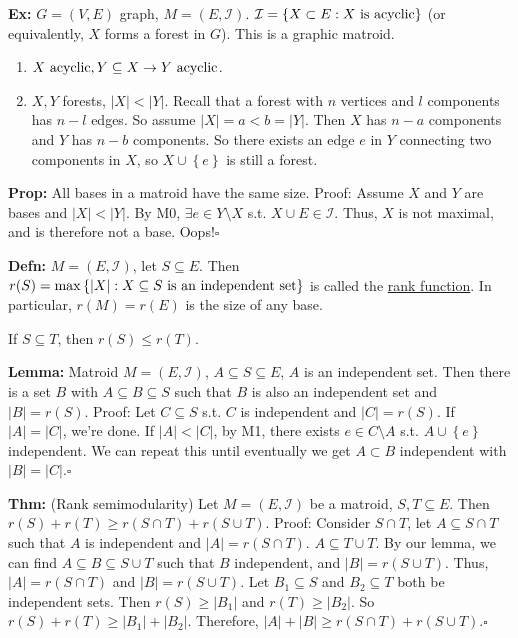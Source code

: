 \documentclass[10pt,letterpaper]{article}
\newcommand{\n}{\hfill\break}
\newcommand{\up}{\vspace{-\baselineskip}}
\newcommand{\lemma}[1]{\par\noindent\settowidth{\hangindent}{\textbf{Lemma: }}\textbf{Lemma: }#1}
\newcommand{\defn}[1]{\par\noindent\settowidth{\hangindent}{\textbf{Defn: }}\textbf{Defn: }#1\n}
\newcommand{\thm}[1]{\par\noindent\settowidth{\hangindent}{\textbf{Thm: }}\textbf{Thm: }#1\n}
\newcommand{\prop}[1]{\par\noindent\settowidth{\hangindent}{\textbf{Prop: }}\textbf{Prop: }#1\n}
\newcommand{\ex}[1]{\par\noindent\settowidth{\hangindent}{\textbf{Ex: }}\textbf{Ex: }#1\n}
\newcommand{\proven}{\;$\square$\n}
\newcommand{\ptxt}[1]{\textrm{\textnormal{#1}}}
\newcommand{\card}[1]{\left|#1\right|}
\newcommand{\set}[1]{\left\{#1\right\}}
\newcommand{\st}{s.t.}
\begin{document}
\ex{$G=(V,E)$ graph, $M=(E,\mathcal{I})$. $\mathcal{I}=\set{X\subset{}E:X\ptxt{ is acyclic}}$ (or equivalently, $X$ forms a forest in $G$). This is a graphic matroid.
\begin{enumerate}[label=M\arabic*), start=0]
	\item $X\ptxt{ acyclic},Y\subseteq{}X\to{}Y\ptxt{ acyclic}$.
	\item $X,Y$ forests, $\card{X}<\card{Y}$. Recall that a forest with $n$ vertices and $l$ components has $n-l$ edges. So assume $\card{X}=a<b=\card{Y}$. Then $X$ has $n-a$ components and $Y$ has $n-b$ components. So there exists an edge $e$ in $Y$ connecting two components in $X$, so $X\cup\set{e}$ is still a forest.
\end{enumerate}
\up}

\prop{All bases in a matroid have the same size.\n
Proof: Assume $X$ and $Y$ are bases and $\card{X}<\card{Y}$. By M0, $\exists{}e\in{}Y\setminus{}X$ \st{} $X\cup{}E\in\mathcal{I}$. Thus, $X$ is not maximal, and is therefore not a base. Oops!\proven}

\defn{$M=(E,\mathcal{I})$, let $S\subseteq{}E$. Then $r(S)=\max\set{\card{X}:X\subseteq{}S\ptxt{ is an independent set}}$ is called the \underline{rank function}. In particular, $r(M)=r(E)$ is the size of any base.}

\par\noindent If $S\subseteq{}T$, then $r(S)\le{}r(T)$.\n

\lemma{Matroid $M=(E,\mathcal{I})$, $A\subseteq{}S\subseteq{}E$, $A$ is an independent set.\n
Then there is a set $B$ with $A\subseteq{}B\subseteq{}S$ such that $B$ is also an independent set and $\card{B}=r(S)$.\n
Proof: Let $C\subseteq{}S$ \st{} $C$ is independent and $\card{C}=r(S)$. If $\card{A}=\card{C}$, we're done. If $\card{A}<\card{C}$, by M1, there exists $e\in{}C\setminus{}A$ \st{} $A\cup\set{e}$ independent. We can repeat this until eventually we get $A\subset{}B$ independent with $\card{B}=\card{C}$.\proven}

\thm{(Rank semimodularity) Let $M=(E,\mathcal{I})$ be a matroid, $S,T\subseteq{}E$.\n
Then $r(S)+r(T)\ge{}r(S\cap{}T)+r(S\cup{}T)$.\n
Proof: Consider $S\cap{}T$, let $A\subseteq{}S\cap{}T$ such that $A$ is independent and $\card{A}=r(S\cap{}T)$. $A\subseteq{}T\cup{}T$. By our lemma, we can find $A\subseteq{}B\subseteq{}S\cup{}T$ such that $B$ independent, and $\card{B}=r(S\cup{}T)$.\n
Thus, $\card{A}=r(S\cap{}T)$ and $\card{B}=r(S\cup{}T)$. Let $B_{1}\subseteq{}S$ and $B_{2}\subseteq{}T$ both be independent sets. Then $r(S)\ge\card{B_{1}}$ and $r(T)\ge\card{B_{2}}$. So $r(S)+r(T)\ge\card{B_{1}}+\card{B_{2}}$.\n
Therefore, $\card{A}+\card{B}\ge{}r(S\cap{}T)+r(S\cup{}T)$.\proven}
\end{document}
